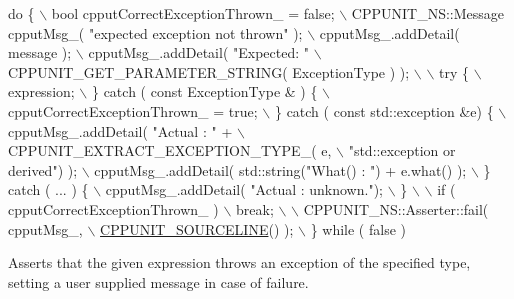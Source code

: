 \begin{DoxyCode}
\textcolor{keywordflow}{do} \{                                                                       \(\backslash\)
      bool cpputCorrectExceptionThrown\_ = \textcolor{keyword}{false};                              \(\backslash\)
      CPPUNIT\_NS::Message cpputMsg\_( \textcolor{stringliteral}{"expected exception not thrown"} );       \(\backslash\)
      cpputMsg\_.addDetail( message );                                         \(\backslash\)
      cpputMsg\_.addDetail( \textcolor{stringliteral}{"Expected: "}                                       \(\backslash\)
                           CPPUNIT\_GET\_PARAMETER\_STRING( ExceptionType ) );   \(\backslash\)
                                                                              \(\backslash\)
      try \{                                                                   \(\backslash\)
         expression;                                                          \(\backslash\)
      \} \textcolor{keywordflow}{catch} ( \textcolor{keyword}{const} ExceptionType & ) \{                                     \(\backslash\)
         cpputCorrectExceptionThrown\_ = \textcolor{keyword}{true};                                 \(\backslash\)
      \} \textcolor{keywordflow}{catch} ( \textcolor{keyword}{const} std::exception &e) \{                                    \(\backslash\)
         cpputMsg\_.addDetail( \textcolor{stringliteral}{"Actual  : "} +                                  \(\backslash\)
                              CPPUNIT\_EXTRACT\_EXCEPTION\_TYPE\_( e,             \(\backslash\)
                                          \textcolor{stringliteral}{"std::exception or derived"}) );     \(\backslash\)
         cpputMsg\_.addDetail( std::string(\textcolor{stringliteral}{"What()  : "}) + e.what() );         \(\backslash\)
      \} \textcolor{keywordflow}{catch} ( ... ) \{                                                       \(\backslash\)
         cpputMsg\_.addDetail( \textcolor{stringliteral}{"Actual  : unknown."});                          \(\backslash\)
      \}                                                                       \(\backslash\)
                                                                              \(\backslash\)
      if ( cpputCorrectExceptionThrown\_ )                                     \(\backslash\)
         break;                                                               \(\backslash\)
                                                                              \(\backslash\)
      CPPUNIT\_NS::Asserter::fail( cpputMsg\_,                                  \(\backslash\)
                                  \hyperlink{group___creating_new_assertions_ga76898763afdc78bf5924dd7744b4c630}{CPPUNIT\_SOURCELINE}() );                     \(\backslash\)
   \} \textcolor{keywordflow}{while} ( \textcolor{keyword}{false} )
\end{DoxyCode}
Asserts that the given expression throws an exception of the specified type, setting a user supplied message in case of failure.

